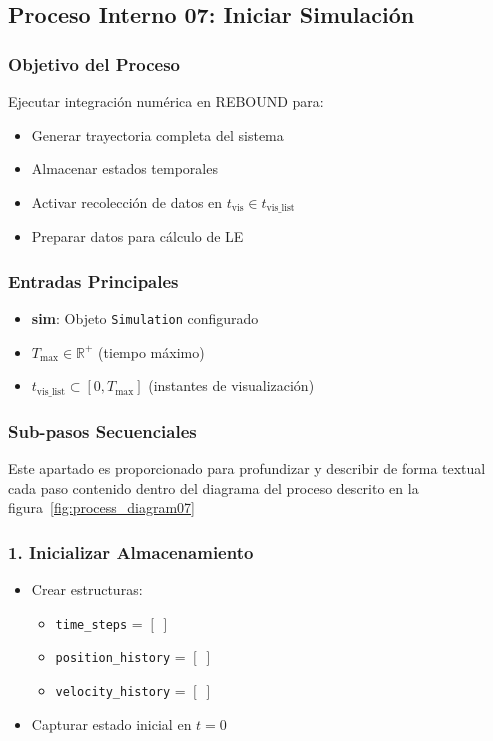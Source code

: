 \subsection{Proceso Interno 07: Iniciar Simulación}

\subsubsection{Objetivo del Proceso}
Ejecutar integración numérica en REBOUND para:
\begin{itemize}
    \item Generar trayectoria completa del sistema
    \item Almacenar estados temporales
    \item Activar recolección de datos en $t_{\text{vis}} \in t_{\text{vis\_list}}$
    \item Preparar datos para cálculo de LE
\end{itemize}

\subsubsection{Entradas Principales}
\begin{itemize}
    \item \textbf{sim}: Objeto \texttt{Simulation} configurado
    \item $T_{\text{max}} \in \mathbb{R}^+$ (tiempo máximo)
    \item $t_{\text{vis\_list}} \subset [0, T_{\text{max}}]$ (instantes de visualización)
\end{itemize}

\subsubsection{Sub-pasos Secuenciales}
Este apartado es proporcionado para profundizar y describir de forma textual cada paso contenido dentro del diagrama del proceso descrito en la figura~\ref{fig:process_diagram07}
\subsubsection*{1. Inicializar Almacenamiento}
\begin{itemize}
    \item Crear estructuras:
    \begin{itemize}
        \item \texttt{time\_steps} = $[\;]$
        \item \texttt{position\_history} = $[\;]$
        \item \texttt{velocity\_history} = $[\;]$
    \end{itemize}
    \item Capturar estado inicial en $t=0$
\end{itemize}

